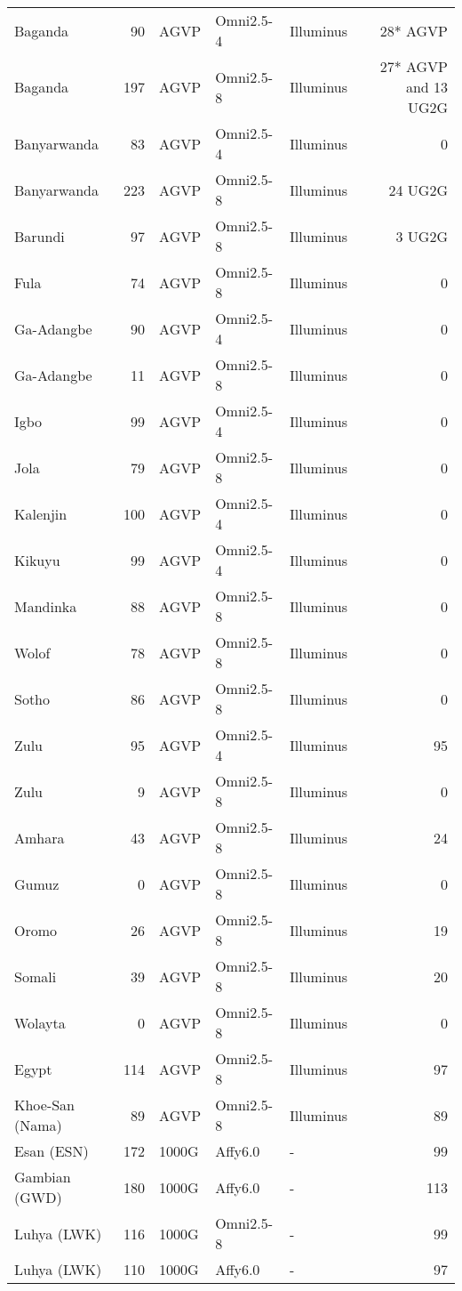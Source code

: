 \begin{table}[htp]
\begin{tabular}{lrlllr}
Baganda & 90 & AGVP & Omni2.5-4 & Illuminus & 28* AGVP \\
Baganda & 197 & AGVP & Omni2.5-8 & Illuminus & 27* AGVP and 13 UG2G \\
Banyarwanda & 83 & AGVP & Omni2.5-4 & Illuminus & 0 \\
Banyarwanda & 223 & AGVP & Omni2.5-8 & Illuminus & 24 UG2G \\
Barundi & 97 & AGVP & Omni2.5-8 & Illuminus & 3 UG2G \\
Fula & 74 & AGVP & Omni2.5-8 & Illuminus & 0 \\
Ga-Adangbe & 90 & AGVP & Omni2.5-4 & Illuminus & 0 \\
Ga-Adangbe & 11 & AGVP & Omni2.5-8 & Illuminus & 0 \\
Igbo & 99 & AGVP & Omni2.5-4 & Illuminus & 0 \\
Jola & 79 & AGVP & Omni2.5-8 & Illuminus & 0 \\
Kalenjin & 100 & AGVP & Omni2.5-4 & Illuminus & 0 \\
Kikuyu & 99 & AGVP & Omni2.5-4 & Illuminus & 0 \\
Mandinka & 88 & AGVP & Omni2.5-8 & Illuminus & 0 \\
Wolof & 78 & AGVP & Omni2.5-8 & Illuminus & 0 \\
Sotho & 86 & AGVP & Omni2.5-8 & Illuminus & 0 \\
Zulu & 95 & AGVP & Omni2.5-4 & Illuminus & 95 \\
Zulu & 9 & AGVP & Omni2.5-8 & Illuminus & 0 \\
Amhara & 43 & AGVP & Omni2.5-8 & Illuminus & 24 \\
Gumuz & 0 & AGVP & Omni2.5-8 & Illuminus & 0 \\
Oromo & 26 & AGVP & Omni2.5-8 & Illuminus & 19 \\
Somali & 39 & AGVP & Omni2.5-8 & Illuminus & 20 \\
Wolayta & 0 & AGVP & Omni2.5-8 & Illuminus & 0 \\
Egypt & 114 & AGVP & Omni2.5-8 & Illuminus & 97 \\
Khoe-San (Nama) & 89 & AGVP & Omni2.5-8 & Illuminus & 89 \\

Esan (ESN) & 172 & 1000G & Affy6.0 & - & 99  \\

Gambian (GWD) & 180 & 1000G & Affy6.0 & - & 113  \\

Luhya (LWK) & 116 & 1000G & Omni2.5-8 & - & 99 \\
Luhya (LWK) & 110 & 1000G & Affy6.0 & - & 97  \\


\end{tabular}
\end{table}
